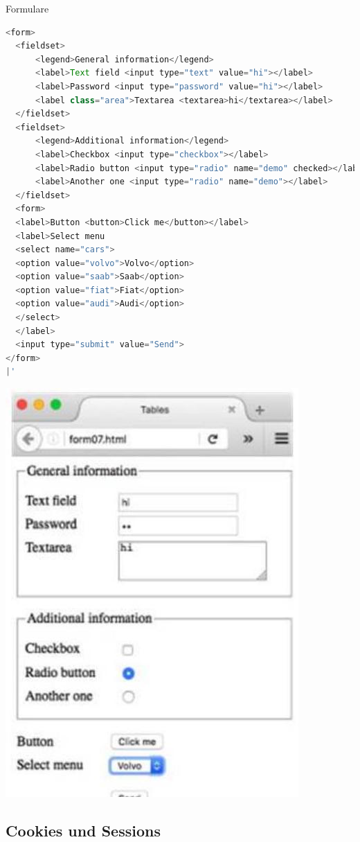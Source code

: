 \begin{example2}{Formulare}
\begin{lstlisting}[language=JavaScript, style=basesmol]
<form>
  <fieldset>
      <legend>General information</legend>
      <label>Text field <input type="text" value="hi"></label>
      <label>Password <input type="password" value="hi"></label>
      <label class="area">Textarea <textarea>hi</textarea></label>
  </fieldset>
  <fieldset>
      <legend>Additional information</legend>
      <label>Checkbox <input type="checkbox"></label>
      <label>Radio button <input type="radio" name="demo" checked></label>
      <label>Another one <input type="radio" name="demo"></label>
  </fieldset>
  <form>
  <label>Button <button>Click me</button></label>
  <label>Select menu
  <select name="cars">
  <option value="volvo">Volvo</option>
  <option value="saab">Saab</option>
  <option value="fiat">Fiat</option>
  <option value="audi">Audi</option>
  </select>
  </label>
  <input type="submit" value="Send">
</form>
|'
\end{lstlisting}



\begin{center}
\includegraphics[width=0.5\linewidth]{images/2024_12_29_858f09cde51177c71657g-29}
\end{center}
\end{example2}

\pagebreak

\subsection{Cookies und Sessions}





